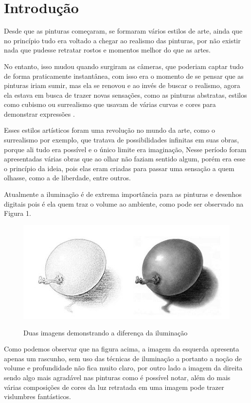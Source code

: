\chapter{Introdução}\label{cap:01}

Desde que as pinturas começaram, se formaram vários estilos de arte, ainda que no princípio tudo era voltado a chegar ao realismo das pinturas, por não existir nada que pudesse retratar rostos e momentos melhor do que as artes.

No entanto, isso mudou quando surgiram as câmeras, que poderiam captar tudo de forma praticamente instantânea, com isso era o momento de se pensar que as pinturas iriam sumir, mas ela se renovou e ao invés de buscar o realismo, agora ela estava em busca de trazer novas sensações, como as pinturas abstratas, estilos como cubismo ou surrealismo que usavam de várias curvas e cores para demonstrar expressões \cite{debora_2021}.

Esses estilos artísticos foram uma revolução no mundo da arte, como o surrealismo por exemplo, que tratava de possibilidades infinitas em suas obras, porque ali tudo era possível e o único limite era imaginação, Nesse período foram apresentadas várias obras que ao olhar não faziam sentido algum, porém era esse o princípio da ideia, pois elas eram criadas para passar uma sensação a quem olhasse, como a de liberdade, entre outros.

Atualmente a iluminação é de extrema importância para as  pinturas e desenhos digitais pois é ela quem traz o volume ao ambiente, como pode ser observado na Figura 1.

\begin{figure}[h]
	\caption{Duas imagens demonstrando a diferença da iluminação }
	\centering
	\includegraphics{imagens/luz-e-sombra-para-produzir-volume.jpg}\cite{Grafitti_2019}
\end{figure}


Como podemos observar que na figura acima, a imagem da esquerda apresenta apenas um rascunho, sem uso das técnicas de iluminação a portanto a noção de volume e profundidade não fica muito claro, por outro lado a imagem da direita sendo algo mais agradável nas pinturas como é possível notar, além do mais várias composições de cores da luz retratada em uma imagem pode trazer vislumbres fantásticos.

